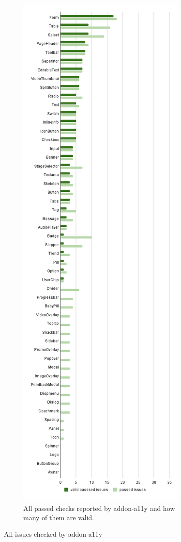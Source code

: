\documentclass{master_thesis}
\begin{document}
\begin{figure}[h]
\begin{subfigure}{0.45\textwidth}
	\label{fig:audit-failed}
	\end{subfigure}
	\begin{subfigure}{0.45\textwidth}
	\includegraphics[height=0.9\textheight]{img/audit-passed.png}
	\caption{All passed checks reported by addon-a11y and how many of them are valid.}
	\label{fig:audit-passed}
	\end{subfigure}
\caption{All issues checked by addon-a11y}
\label{fig:audit-passed-failed}
\end{figure}
\end{document}
